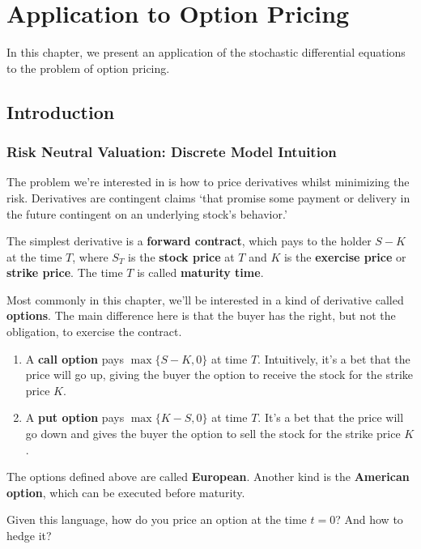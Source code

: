 \chapter{Application to Option Pricing}

In this chapter, we present an application of the stochastic differential equations to the problem of option pricing. 

\section{Introduction}

\subsection{Risk Neutral Valuation: Discrete Model Intuition}

The problem we're interested in is how to price derivatives whilst minimizing the risk. Derivatives are contingent claims `that promise some payment or delivery in the future contingent on an underlying stock's behavior.' \cite[p. 3]{baxter1996financial}

The simplest derivative is a \textbf{forward contract}, which pays to the holder $S-K$ at the time $T$, where $S_T$ is the \textbf{stock price} at $T$ and $K$ is the \textbf{exercise price} or \textbf{strike price}. The time $T$ is called \textbf{maturity time}.

Most commonly in this chapter, we'll be interested in a kind of derivative called \textbf{options}. The main difference here is that the buyer has the right, but not the obligation, to exercise the contract.
\begin{enumerate}
    \item A \textbf{call option} pays $\max \{ S-K, 0 \}$ at time $T$. Intuitively, it's a bet that the price will go up, giving the buyer the option to receive the stock for the strike price $K$.
    \item A \textbf{put option} pays $\max \{ K-S, 0 \}$ at time $T$. It's a bet that the price will go down and gives the buyer the option to sell the stock for the strike price $K$.
\end{enumerate}

The options defined above are called \textbf{European}. Another kind is the \textbf{American option}, which can be executed before maturity.

Given this language, how do you price an option at the time $t = 0$? And how to hedge it? 

